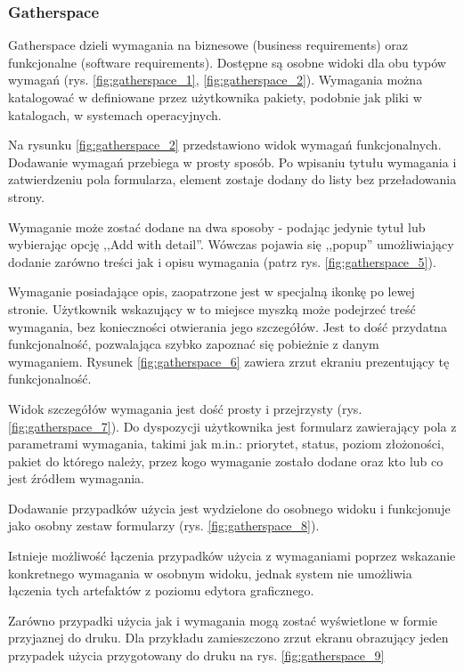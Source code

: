       \subsubsection{Gatherspace}
        Gatherspace dzieli wymagania na biznesowe (business requirements) oraz funkcjonalne (software requirements). Dostępne są osobne widoki dla obu typów wymagań (rys. \ref{fig:gatherspace_1}, \ref{fig:gatherspace_2}). Wymagania można katalogować w definiowane przez użytkownika pakiety, podobnie jak pliki w katalogach, w systemach operacyjnych. 


        Na rysunku \ref{fig:gatherspace_2} przedstawiono widok wymagań funkcjonalnych. Dodawanie wymagań przebiega w prosty sposób. Po wpisaniu tytułu wymagania i zatwierdzeniu pola formularza, element zostaje dodany do listy bez przeładowania strony.

        Wymaganie może zostać dodane na dwa sposoby - podając jedynie tytuł lub wybierając opcję ,,Add with detail''. Wówczas pojawia się ,,popup'' umożliwiający dodanie zarówno treści jak i opisu wymagania (patrz rys. \ref{fig:gatherspace_5}).

        Wymaganie posiadające opis, zaopatrzone jest w specjalną ikonkę po lewej stronie. Użytkownik wskazujący w to miejsce myszką może podejrzeć treść wymagania, bez konieczności otwierania jego szczegółów. Jest to dość przydatna funkcjonalność, pozwalająca szybko zapoznać się pobieżnie z danym wymaganiem. Rysunek \ref{fig:gatherspace_6} zawiera zrzut ekraniu prezentujący tę funkcjonalność. 
        
        Widok szczegółów wymagania jest dość prosty i przejrzysty (rys. \ref{fig:gatherspace_7}). Do dyspozycji użytkownika jest formularz zawierający pola z parametrami wymagania, takimi jak m.in.: priorytet, status, poziom złożoności, pakiet do którego należy, przez kogo wymaganie zostało dodane oraz kto lub co jest źródłem wymagania.

        Dodawanie przypadków użycia jest wydzielone do osobnego widoku i funkcjonuje jako osobny zestaw formularzy (rys. \ref{fig:gatherspace_8}). 

        Istnieje możliwość łączenia przypadków użycia z wymaganiami poprzez wskazanie konkretnego wymagania w osobnym widoku, jednak system nie umożliwia łączenia tych artefaktów z poziomu edytora graficznego.

        Zarówno przypadki użycia jak i wymagania mogą zostać wyświetlone w formie przyjaznej do druku. Dla przykładu zamieszczono zrzut ekranu obrazujący jeden przypadek użycia przygotowany do druku na rys. \ref{fig:gatherspace_9}

